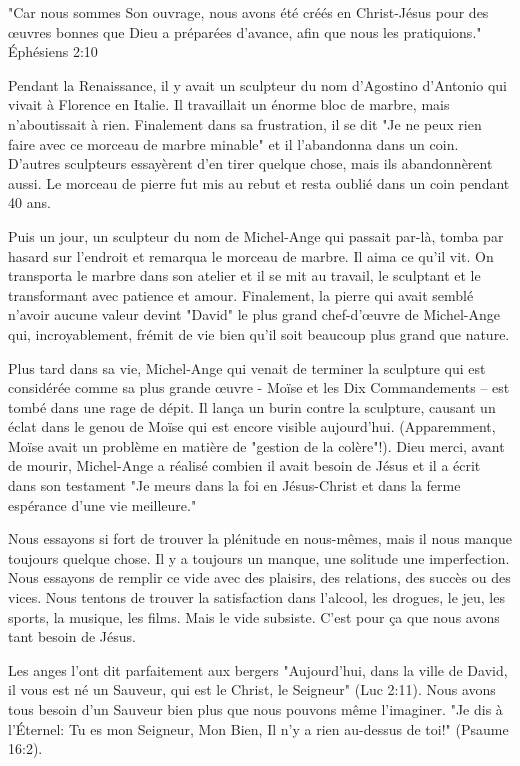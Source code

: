 

"Car nous sommes Son ouvrage, nous avons été créés en Christ-Jésus pour des œuvres bonnes que Dieu a préparées d'avance, afin que nous les pratiquions." ~ Éphésiens 2:10

Pendant la Renaissance, il y avait un sculpteur du nom d'Agostino d'Antonio qui vivait à Florence en Italie. Il travaillait un énorme bloc de marbre, mais n'aboutissait à rien. Finalement dans sa frustration, il se dit "Je ne peux rien faire avec ce morceau de marbre minable" et il l'abandonna dans un coin. D'autres sculpteurs essayèrent d'en tirer quelque chose, mais ils abandonnèrent aussi. Le morceau de pierre fut mis au rebut et resta oublié dans un coin pendant 40 ans.

Puis un jour, un sculpteur du nom de Michel-Ange qui passait par-là, tomba par hasard sur l'endroit et remarqua le morceau de marbre. Il aima ce qu'il vit. On transporta le marbre dans son atelier et il se mit au travail, le sculptant et le transformant avec patience et amour. Finalement, la pierre qui avait semblé n'avoir aucune valeur devint       "David" le plus grand chef-d'œuvre de Michel-Ange qui, incroyablement, frémit de vie bien qu'il soit beaucoup plus grand que nature.

Plus tard dans sa vie, Michel-Ange qui venait de terminer la sculpture qui est considérée comme sa plus grande œuvre - Moïse et les Dix Commandements – est tombé dans une rage de dépit. Il lança un burin contre la sculpture, causant un éclat dans le genou de Moïse qui est encore visible aujourd'hui. (Apparemment, Moïse avait un problème en matière de "gestion de la colère"!). Dieu merci, avant de mourir, Michel-Ange a réalisé combien il avait besoin de Jésus et il a écrit dans son testament "Je meurs dans la foi en Jésus-Christ et dans la ferme espérance d'une vie meilleure."

Nous essayons si fort de trouver la plénitude en nous-mêmes, mais il nous manque toujours quelque chose. Il y a toujours un manque, une solitude une imperfection. Nous essayons de remplir ce vide avec des plaisirs, des relations, des succès ou des vices. Nous tentons de trouver la satisfaction dans l'alcool, les drogues, le jeu, les sports, la musique, les films. Mais le vide subsiste. C'est pour ça que nous avons tant besoin de Jésus.

Les anges l'ont dit parfaitement aux bergers    "Aujourd'hui, dans la ville de David, il vous est né un Sauveur, qui est le Christ, le Seigneur" (Luc 2:11). Nous avons tous besoin d'un Sauveur bien plus que nous pouvons même l'imaginer. "Je dis à l'Éternel: Tu es mon Seigneur, Mon Bien, Il n'y a rien au-dessus de toi!" (Psaume 16:2).

